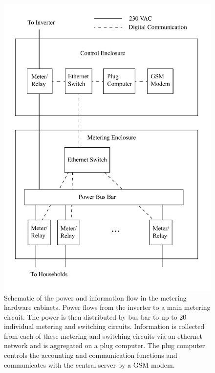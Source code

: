 \documentclass{sig-alternate}
\begin{document}
\begin{figure}[]
\begin{center}
\includegraphics[width=\columnwidth]{figures/Enclosure.pdf}
\end{center}
\caption{Schematic of the power and information flow in the metering hardware cabinets.
Power flows from the inverter to a main metering circuit.  The power is then distributed
by bus bar to up to 20 individual metering and switching circuits.  Information is collected
from each of these metering and switching circuits via an ethernet network and is aggregated
on a plug computer.  The plug computer controls the accounting and communication functions
and communicates with the central server by a GSM modem.}
\label{Enclosure}
\end{figure}
\end{document}

